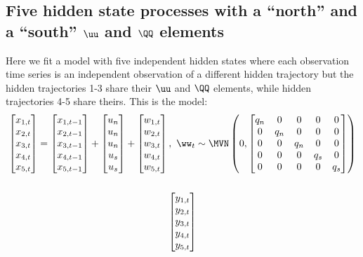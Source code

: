 \subsection{Five hidden state processes with a ``north'' and a ``south'' $\uu$ and $\QQ$ elements}
Here we fit a model with five independent hidden states where each observation time series is an independent observation of a different hidden trajectory
but the hidden trajectories 1-3 share their $\uu$ and $\QQ$ elements, while hidden trajectories 4-5 share theirs.  This is the model:
\begin{gather*}
\begin{bmatrix}x_{1,t}\\x_{2,t}\\x_{3,t}\\x_{4,t}\\x_{5,t}\end{bmatrix}
= \begin{bmatrix}x_{1,t-1}\\x_{2,t-1}\\x_{3,t-1}\\x_{4,t-1}\\x_{5,t-1}\end{bmatrix}
+ \begin{bmatrix}u_n\\u_n\\u_n\\u_s\\u_s\end{bmatrix}
+ \begin{bmatrix}w_{1,t}\\w_{2,t}\\w_{3,t}\\w_{4,t}\\w_{5,t}\end{bmatrix},  
 \textrm{ } \ww_t \sim \MVN\begin{pmatrix} 0,\begin{bmatrix}q_n&0&0&0&0\\0&q_n&0&0&0\\0&0&q_n&0&0\\0&0&0&q_s&0\\0&0&0&0&q_s\end{bmatrix} \end{pmatrix}  \\
\\
\begin{bmatrix}y_{1,t}\\y_{2,t}\\y_{3,t}\\y_{4,t}\\y_{5,t}\end{bmatrix}

\end{gather*}
